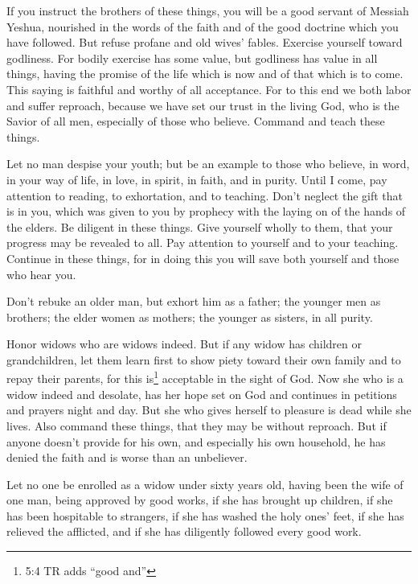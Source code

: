 \myverse{}If you instruct the brothers of these things, you will be a good
servant of Messiah Yeshua, nourished in the words of the faith and of the good doctrine which you have
followed.
\myverse{}But refuse profane and old wives’ fables. Exercise yourself toward godliness.
\myverse{}For bodily exercise has some value, but godliness has value in all things, having
the promise of the life which is now and of that which is to come.
\myverse{}This saying is faithful and worthy of all acceptance.
\myverse{}For to this end we both labor and suffer reproach, because we have set our
trust in the living God, who is the Savior of all men, especially of those who believe.
\myverse{}Command and teach these things.

\myverse{}Let no man despise your youth; but be an example to those who
believe, in word, in your way of life, in love, in spirit, in faith, and in purity.
\myverse{}Until I come, pay attention to reading, to exhortation, and to teaching.
\myverse{}Don’t neglect the gift that is in you, which was given to you by prophecy
with the laying on of the hands of the elders.
\myverse{}Be diligent in these things. Give yourself wholly to them, that your progress
may be revealed to all.
\myverse{}Pay attention to yourself and to your teaching. Continue in these things,
for in doing this you will save both yourself and those who hear you.


\mychapter{} \myverse*{}Don’t rebuke an older man, but exhort him as a father; the younger
men as brothers;
\myverse{}the elder women as mothers; the younger as sisters, in all purity.

\myverse{}Honor widows who are widows indeed.
\myverse{}But if any widow has children or grandchildren, let them learn first to show
piety toward their own family and to repay their parents, for this is\footnote{5:4 TR adds “good and”} acceptable in the sight of God.
\myverse{}Now she who is a widow indeed and desolate, has her hope set on God and continues
in petitions and prayers night and day.
\myverse{}But she who gives herself to pleasure is dead while she lives.
\myverse{}Also command these things, that they may be without reproach.
\myverse{}But if anyone doesn’t provide for his own, and especially his own household,
he has denied the faith and is worse than an unbeliever.

\myverse{}Let no one be enrolled as a widow under sixty years old, having
been the wife of one man,
\myverse{}being approved by good works, if she has brought up children, if she has been
hospitable to strangers, if she has washed the holy ones’ feet, if she has relieved the afflicted, and
if she has diligently followed every good work.


